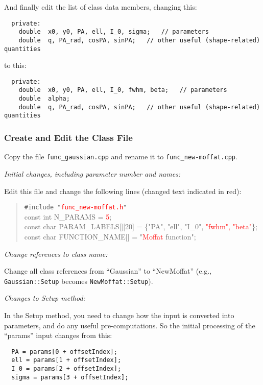 \documentclass[10pt,a4paper,article]{memoir}
\newcommand{\red}{\textcolor{red}}
\begin{document}
And finally edit the list of class data members, changing this:
\begin{verbatim}
  private:
    double  x0, y0, PA, ell, I_0, sigma;   // parameters
    double  q, PA_rad, cosPA, sinPA;   // other useful (shape-related) quantities
\end{verbatim}
to this:
\begin{verbatim}
  private:
    double  x0, y0, PA, ell, I_0, fwhm, beta;   // parameters
    double  alpha;
    double  q, PA_rad, cosPA, sinPA;   // other useful (shape-related) quantities
\end{verbatim}


\subsubsection{Create and Edit the Class File}

Copy the file \texttt{func\_gaussian.cpp} and rename it to \texttt{func\_new-moffat.cpp}. 

\bigskip
\noindent \textit{Initial changes, including parameter number and names:}
\smallskip

Edit this file and change the following lines (changed text indicated in red):

\begin{quote}
\texttt{\#include "\red{func\_new-moffat.h}"} \\

const int  N\_PARAMS = \red{5}; \\

const char  PARAM\_LABELS[][20] = \{"PA", "ell", "I\_0", \red{"fwhm", "beta"}\}; \\

const char  FUNCTION\_NAME[] = "\red{Moffat} function";

\end{quote}

\bigskip
\noindent \textit{Change references to class name:}
\smallskip

Change all class references from ``Gaussian'' to ``NewMoffat'' (e.g., \texttt{Gaussian::Setup}
becomes \texttt{NewMoffat::Setup}).

\bigskip
\noindent \textit{Changes to Setup method:}
\smallskip

In the Setup method, you need to change how the input is converted into
parameters, and do any useful pre-computations. So the initial processing of
the ``params'' input changes from this:
\begin{verbatim}
  PA = params[0 + offsetIndex];
  ell = params[1 + offsetIndex];
  I_0 = params[2 + offsetIndex];
  sigma = params[3 + offsetIndex];
\end{verbatim}
\end{document}

